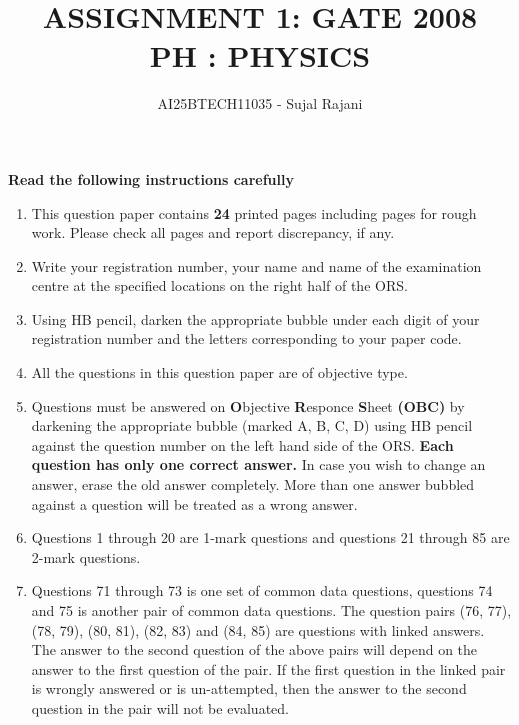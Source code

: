 \documentclass[journal,12pt,onecolumn]{IEEEtran}
\theoremstyle{remark}
\begin{document}
\title{
ASSIGNMENT 1: GATE 2008 \\
    PH : PHYSICS }
\author{AI25BTECH11035 - Sujal Rajani }
\maketitle
\renewcommand{\thefigure}{\theenumi}
\renewcommand{\thetable}{\theenumi}



\textbf{Read the following instructions carefully}
\begin{enumerate}
        \item This question paper contains \textbf{24} printed pages including pages for rough work. Please check all pages and report discrepancy, if any.

    \item Write your registration number, your name and name of the examination centre at the specified locations on the right half of the ORS.

    \item Using HB pencil, darken the appropriate bubble under each digit of your registration number and the letters corresponding to your paper code.

    \item All the questions in this question paper are of objective type.

    \item Questions must be answered on \textbf{O}bjective \textbf{R}esponce \textbf{S}heet \textbf{(OBC)} by darkening the appropriate bubble (marked A, B, C, D) using HB pencil against the question number on the left hand side of the ORS. \textbf{Each question has only one correct answer.} In case you wish to change an answer, erase the old answer completely. More than one answer bubbled against a question will be treated as a wrong answer.

    \item Questions 1 through 20 are 1-mark questions and questions 21 through 85 are 2-mark questions.

    \item Questions 71 through 73 is one set of common data questions, questions 74 and 75 is another pair of common data questions. The question pairs (76, 77), (78, 79), (80, 81), (82, 83) and (84, 85) are questions with linked answers. The answer to the second question of the above pairs will depend on the answer to the first question of the pair. If the first question in the linked pair is wrongly answered or is un-attempted, then the answer to the second question in the pair will not be evaluated.


\end{enumerate}
\end{document}
